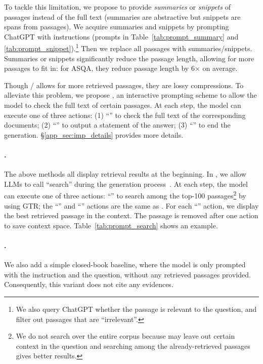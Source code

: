 To tackle this limitation, we propose to provide \textit{summaries} or \textit{snippets} of passages instead of the full text (summaries are abstractive but snippets are spans from passages). 
We acquire summaries and snippets by prompting ChatGPT with instructions (prompts in Table~\ref{tab:prompt_summary} and \ref{tab:prompt_snippet}).\footnote{We also query ChatGPT whether the passage is relevant to the question, and
filter out passages that are ``irrelevant''.}
Then we replace all passages with  summaries/snippets.
Summaries or snippets significantly reduce the passage length, allowing for more passages to fit in:
for ASQA, they reduce passage length by 6$\times$ on average.


Though \summ{}/\snippet{} allows for more retrieved passages, 
they are lossy compressions. 
To alleviate this problem,
we propose \interact{}, an interactive prompting scheme 
to allow the model to check the full text of certain passages. %
At each step, the model can execute one of  three actions: 
(1) ``'' to check the full text of the corresponding documents;
(2) ``'' to output a statement of the answer;
(3) ``'' to end the generation.
\S\ref{app_sec:imp_details} provides more details.





\paragraph{\textsc{\psearch{}}.}
The above methods all display retrieval results at the beginning.
In \search{},
we allow LLMs to call ``search'' during the generation process~\citep{yao2023react,press2022measuring,jiang2023active}.
At each step, the model can execute one of  three actions: 
``'' to search among the top-100 passages\footnote{We do not search over the entire corpus because   may leave out certain context in the question and searching among the already-retrieved passages gives better results.} by using GTR; the ``'' and ``'' actions are the same as \interact{}.
For each ``'' action, we display the best retrieved passage in the context.
The passage is removed after one action to save context space.
Table~\ref{tab:prompt_search} shows an example. %



\paragraph{\textsc{\pclose{}}.}
We also add a simple closed-book baseline, where the model is only prompted with the instruction and the question,
without any retrieved passages provided.
Consequently, this variant does not cite any evidences.

